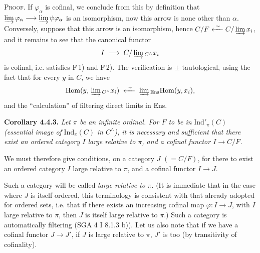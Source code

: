 \documentclass[11pt]{article}
\newcommand{\printedpage}[1]{\marginpar{\footnotesize p.~#1}}
\newcommand{\msp}[1]{\marginpar{\footnotesize [#1]}}
\newcommand{\Ind}{\mathrm{Ind}}
\newcommand{\Hom}{\mathrm{Hom}}
\begin{document}
\textsc{Proof}. If $\varphi_\alpha$ is cofinal, we conclude from this by definition that $\varinjlim \varphi_\alpha \longrightarrow \varinjlim \psi\varphi_\alpha$ is an isomorphism, now this arrow is none other than $\alpha$. Conversely, suppose that this arrow is an isomorphism, hence $C/F \xleftarrow{\;\sim\;} C/\varinjlim x_i$, and it remains to see that the canonical functor
\[
I \;\longrightarrow\; C/\varinjlim{}_{C^{\wedge}} x_i
\]
is cofinal, i.e. satisfies F\,1) and F\,2). The verification is $\pm$ tautological, using the fact that for every $y$ in $C$, we have
\[
\Hom(y,\, \varinjlim{}_{C^{\wedge}} x_i) \;\xleftarrow{\;\sim\;}\; \varinjlim{}_{\mathrm{Ens}}\Hom(y,x_i),
\]
and the ``calculation'' of filtering direct limits in Ens.

\textbf{Corollary 4.4.3.} \textit{Let $\pi$ be an infinite ordinal. For $F$ to be in} $\Ind'_\pi(C)$ \textit{(essential image of} $\Ind_\pi(C)$ \textit{in $C^{\wedge}$), it is necessary and sufficient that there exist an ordered category $I$ large relative to $\pi$, and a cofinal functor $I \longrightarrow C/F$.}

We must therefore give conditions, on a category $J$ $(= C/F)$, for there to exist an ordered category $I$ large relative to $\pi$, and a cofinal functor $I \longrightarrow J$.

\msp{page 81}
Such a category will be called \textit{large relative to} $\pi$. (It is immediate that in the case where $J$ is itself ordered, this terminology is consistent with that already adopted for ordered sets, i.e. that if there exists an increasing cofinal map $\varphi : I \longrightarrow J$, with $I$ large relative to $\pi$, then $J$ is itself large relative to $\pi$.) Such a category is
\printedpage{17}
automatically filtering (SGA 4 I 8.1.3 b)). Let us also note that if we have a cofinal functor $J \longrightarrow J'$, if $J$ is large relative to $\pi$, $J'$ is too (by transitivity of cofinality).
\end{document}
